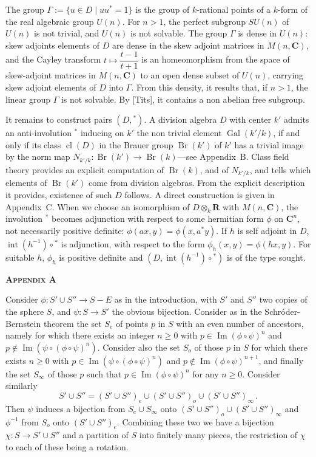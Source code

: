 \documentclass[12pt,a4paper]{article}
\theoremstyle{plain}
\theoremstyle{remark}
\DeclareMathOperator{\Gal}{Gal}
\DeclareMathOperator{\Br}{Br}
\DeclareMathOperator{\cl}{cl}
\DeclareMathOperator{\im}{Im}
\DeclareMathOperator{\Int}{int}
\begin{document}
The group $\Gamma := \{u \in D \mid uu^* = 1\}$ is the group of $k$-rational points of a
$k$-form of the real algebraic group $U(n)$. For $n > 1$, the perfect subgroup $SU(n)$
of $U(n)$ is not trivial, and $U(n)$ is not solvable. The group $\Gamma$ is dense in $U(n)$:
skew adjoints elements of $D$ are dense in the skew adjoint matrices in $M(n, \mathbf{C})$,
and the Cayley transform $t \mapsto \dfrac{t-1}{t+1}$ is an homeomorphism from the space of
skew-adjoint matrices in $M(n, \mathbf{C})$ to an open dense subset of $U(n)$, carrying
skew adjoint elements of $D$ into $\Gamma$. From this density, it results that, if $n > 1$,
the linear group $\Gamma$ is not solvable. By {[}Tits{]}, it contains a non abelian free
subgroup.

It remains to construct pairs $(D, {}^*)$. A division algebra $D$ with center $k'$
admits an anti-involution ${}^*$ inducing on $k'$ the non trivial element $\Gal(k'/k)$, if
and only if its class $\cl(D)$ in the Brauer group $\Br(k')$ of $k'$ has a trivial image
by the norm map $N_{k'/k} : \Br(k') \to \Br(k)$---see Appendix~B. Class field theory
provides an explicit computation of $\Br(k)$, and of $N_{k'/k}$, and tells which elements
of $\Br(k')$ come from division algebras. From the explicit description it provides,
existence of such $D$ follows. A direct construction is given in Appendix~C. When
we choose an isomorphism of $D \otimes_k \mathbf{R}$ with $M(n, \mathbf{C})$, the involution ${}^*$ becomes
adjunction with respect to some hermitian form $\phi$ on $\mathbf{C}^n$, not necessarily positive
definite: $\phi(ax, y) = \phi(x, a^*y)$. If $h$ is self adjoint in $D$, $\Int(h^{-1}) \circ {}^*$ is adjunction,
with respect to the form $\phi_h(x, y) = \phi(hx, y)$. For suitable $h$, $\phi_h$ is positive definite
and $(D, \Int(h^{-1}) \circ {}^*)$ is of the type sought.

\vspace{0.5cm}
\begin{center}
\textbf{\textsc{Appendix A}}
\end{center}
\vspace{0.3cm}

Consider $\phi : S' \cup S'' \to S - E$ as in the introduction, with $S'$ and $S''$ two
copies of the sphere $S$, and $\psi : S \to S'$ the obvious bijection. Consider as in the
Schr\'{o}der-Bernstein theorem the set $S_e$ of points $p$ in $S$ with an even number
of ancestors, namely for which there exists an integer $n \geq 0$ with $p \in \im(\phi \circ \psi)^n$
and $p \notin \im(\psi \circ (\phi \circ \psi)^n)$. Consider also the set $S_o$ of those $p$ in $S$ for which there
exists $n \geq 0$ with $p \in \im(\psi \circ (\phi \circ \psi)^n)$ and $p \notin \im(\phi \circ \psi)^{n+1}$, and finally the set $S_{\infty}$
of those $p$ such that $p \in \im(\phi \circ \psi)^n$ for any $n \geq 0$. Consider similarly
\[
S' \cup S'' = (S' \cup S'')_e \cup (S' \cup S'')_o \cup (S' \cup S'')_{\infty}\,.
\]
Then $\psi$ induces a bijection from $S_e \cup S_{\infty}$ onto $(S' \cup S'')_o \cup (S' \cup S'')_{\infty}$ and $\phi^{-1}$
from $S_o$ onto $(S' \cup S'')_e$. Combining these two we have a bijection $\chi : S \to S' \cup S''$
and a partition of $S$ into finitely many pieces, the restriction of $\chi$ to each of
these being a rotation.
\end{document}
